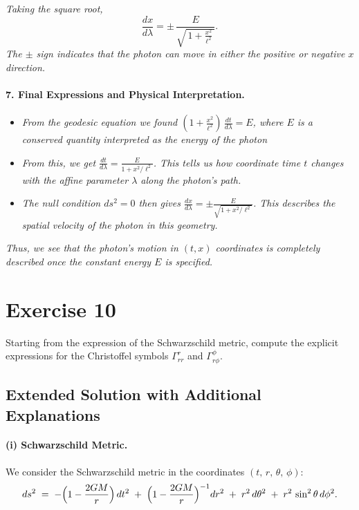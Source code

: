\documentclass{article}
\begin{document}
\textit{Taking the square root,}
\begin{equation*}
\frac{dx}{d\lambda}
= \pm\,\frac{E}{\sqrt{\,1 + \frac{x^2}{\ell^2}\,}}.
\end{equation*}
\textit{The \(\pm\) sign indicates that the photon can move in either the positive or negative \(x\) direction.}

\paragraph{7. Final Expressions and Physical Interpretation.}

\begin{itemize}
\item \textit{From the geodesic equation we found \(\displaystyle \left(1 + \frac{x^2}{\ell^2}\right)\,\frac{dt}{d\lambda} = E\), where \(E\) is a \emph{conserved} quantity interpreted as the energy of the photon}
\item \textit{From this, we get \(\displaystyle \frac{dt}{d\lambda} = \frac{E}{1 + x^2/\ell^2}\). \emph{This tells us how coordinate time \(t\) changes with the affine parameter \(\lambda\) along the photon's path.}}
\item \textit{The null condition \(ds^2 = 0\) then gives \(\displaystyle \frac{dx}{d\lambda} = \pm \frac{E}{\sqrt{1 + x^2/\ell^2}}\). \emph{This describes the spatial velocity of the photon in this geometry.}}
\end{itemize}

\textit{Thus, we see that the photon's motion in \((t,x)\) coordinates is completely described once the constant energy \(E\) is specified.}

\pagebreak
\section*{Exercise 10}

\noindent
Starting from the expression of the Schwarzschild metric, compute the explicit expressions for the Christoffel symbols \(\Gamma_{r r}^{r}\) and \(\Gamma_{r \phi}^{\phi}\).

\bigskip
\subsection*{Extended Solution with Additional Explanations}

\paragraph{(i) Schwarzschild Metric.}
We consider the Schwarzschild metric in the coordinates \((t,\,r,\,\theta,\,\phi)\):
\[
ds^2 \;=\;
-\Bigl(1 - \frac{2GM}{r}\Bigr)\,dt^2
\;+\;
\Bigl(1 - \frac{2GM}{r}\Bigr)^{-1} dr^2
\;+\;
r^2 \, d\theta^2
\;+\;
r^2 \, \sin^2\theta \, d\phi^2.
\]
\end{document}
